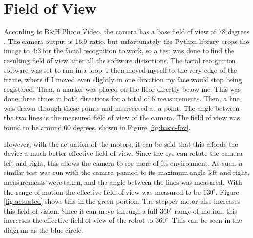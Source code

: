 \section{Field of View}
\label{ch:fov}
According to B\&H Photo Video, the camera has a base field of view of 78 degrees \cite{b&hphotovideoLogitechC615Webcam}. The camera output is 16:9 ratio, but unfortunately the Python library crops the image to 4:3 for the facial recognition to work, so a test was done to find the resulting field of view after all the software distortions. The facial recognition software was set to run in a loop. I then moved myself to the very edge of the frame, where if I moved even slightly in one direction my face would stop being registered. Then, a marker was placed on the floor directly below me. This was done three times in both directions for a total of 6 measurements. Then, a line was drawn through these points and insersected at a point. The angle between the two lines is the measured field of view of the camera. The field of view was found to be around 60 degrees, shown in Figure \ref{fig:basic-fov}. 

However, with the actuation of the motors, it can be said that this affords the device a much better effective field of view. Since the eye can rotate the camera left and right, this allows the camera to see more of its environment. As such, a similar test was run with the camera panned to its maximum angle left and right, measurements were taken, and the angle between the lines was measured. With the range of motion the effective field of view was measured to be $130^\circ$. Figure \ref{fig:actuated} shows this in the green portion. The stepper motor also increases this field of vision. Since it can move through a full $360^\circ$ range of motion, this increases the effective field of view of the robot to $360^\circ$. This can be seen in the diagram as the blue circle.

